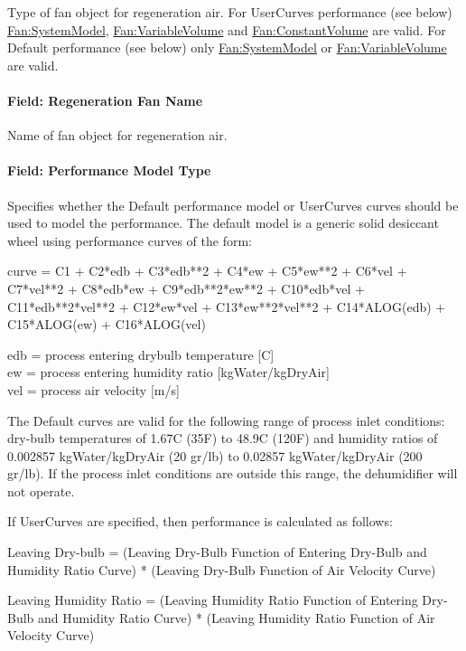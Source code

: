 Type of fan object for regeneration air. For UserCurves performance (see below) \hyperref[fansystemmodel]{Fan:SystemModel}, \hyperref[fanvariablevolume]{Fan:VariableVolume} and \hyperref[fanconstantvolume]{Fan:ConstantVolume} are valid. For Default performance (see below) only \hyperref[fansystemmodel]{Fan:SystemModel} or \hyperref[fanvariablevolume]{Fan:VariableVolume} are valid.

\paragraph{Field: Regeneration Fan Name}\label{field-regeneration-fan-name}

Name of fan object for regeneration air.

\paragraph{Field: Performance Model Type}\label{field-performance-model-type}

Specifies whether the Default performance model or UserCurves curves should be used to model the performance. The default model is a generic solid desiccant wheel using performance curves of the form:

curve = C1 + C2*edb + C3*edb**2 + C4*ew + C5*ew**2 + C6*vel + C7*vel**2 + C8*edb*ew + C9*edb**2*ew**2 + C10*edb*vel + C11*edb**2*vel**2 + C12*ew*vel + C13*ew**2*vel**2 + C14*ALOG(edb) + C15*ALOG(ew) + C16*ALOG(vel)

edb = process entering drybulb temperature {[}C{]}\\
ew = process entering humidity ratio {[}kgWater/kgDryAir{]}\\
vel = process air velocity {[}m/s{]}

The Default curves are valid for the following range of process inlet conditions: dry-bulb temperatures of 1.67C (35F) to 48.9C (120F) and humidity ratios of 0.002857 kgWater/kgDryAir (20 gr/lb) to 0.02857 kgWater/kgDryAir (200 gr/lb). If the process inlet conditions are outside this range, the dehumidifier will not operate.

If UserCurves are specified, then performance is calculated as follows:

Leaving Dry-bulb = (Leaving Dry-Bulb Function of Entering Dry-Bulb and Humidity Ratio Curve) * (Leaving Dry-Bulb Function of Air Velocity Curve)

Leaving Humidity Ratio = (Leaving Humidity Ratio Function of Entering Dry-Bulb and Humidity Ratio Curve) * (Leaving Humidity Ratio Function of Air Velocity Curve)

